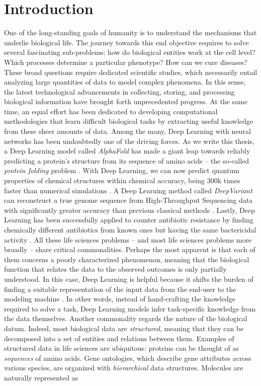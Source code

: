 
\chapter{Introduction}\label{ch:introduction}
One of the long-standing goals of humanity is to understand the mechanisms that underlie biological life. The journey towards this end objective requires to solve several fascinating sub-problems: how do biological entities work at the cell level? Which processes determine a particular phenotype? How can we cure diseases? These broad questions require dedicated scientific studies, which necessarily entail analyzing large quantities of data to model complex phenomena. In this sense, the latest technological advancements in collecting, storing, and processing biological information have brought forth unprecedented progress. At the same time, an equal effort has been dedicated to developing computational methodologies that learn difficult biological tasks by extracting useful knowledge from these sheer amounts of data. Among the many, Deep Learning with neural networks \citep{lecun2015naturedeeplearning} has been undoubtedly one of the driving forces. As we write this thesis, a Deep Learning model called \emph{AlphaFold} has made a giant leap towards reliably predicting a protein's structure from its sequence of amino acids -- the so-called \emph{protein folding} problem \citep{senior2020alphafold}. With Deep Learning, we can now predict quantum properties of chemical structures within chemical accuracy, being 300k times faster than numerical simulations  \citep{gilmer2017neuralmessagepassing}. A Deep Learning method called \emph{DeepVariant} can reconstruct a true genome sequence from High-Throughput Sequencing data with significantly greater accuracy than previous classical methods \citep{poplin2018deepvariant}. Lastly, Deep Learning has been successfully applied to counter antibiotic resistance by finding chemically different antibiotics from known ones but having the same bactericidal activity \citep{stokes2020deeplearningantibiotic}. All these life sciences problems -- and most life sciences problems more broadly -- share critical commonalities. Perhaps the most apparent is that each of them concerns a poorly characterized phenomenon, meaning that the biological function that relates the data to the observed outcomes is only partially understood. In this case, Deep Learning is helpful because it shifts the burden of finding a suitable representation of the input data from the end-user to the modeling machine  \citep{bengio2014representationlearning}. In other words, instead of hand-crafting the knowledge required to solve a task, Deep Learning models infer task-specific knowledge from the data themselves. Another commonality regards the nature of the biological datum. Indeed, most biological data are \emph{structured}, meaning that they can be decomposed into a set of entities and relations between them. Examples of structured data in life sciences are ubiquitous: proteins can be thought of as \emph{sequences} of amino acids. Gene ontologies, which describe gene attributes across various species, are organized with \emph{hierarchical} data structures. Molecules are naturally represented as 